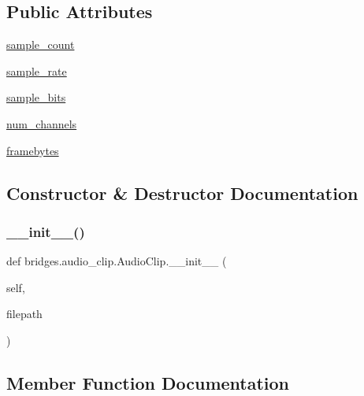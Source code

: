 \subsection*{Public Attributes}
\begin{DoxyCompactItemize}
\item 
\hyperlink{classbridges_1_1audio__clip_1_1_audio_clip_ac9551b041b0d6b7e7b2a1db623c56159}{sample\+\_\+count}
\item 
\hyperlink{classbridges_1_1audio__clip_1_1_audio_clip_a265e017578bdd94664f308f51b596c6d}{sample\+\_\+rate}
\item 
\hyperlink{classbridges_1_1audio__clip_1_1_audio_clip_a274e7ae8cd17a96d068265795b9c0718}{sample\+\_\+bits}
\item 
\hyperlink{classbridges_1_1audio__clip_1_1_audio_clip_ace413dc6646f965e2d0f75e1d84000c9}{num\+\_\+channels}
\item 
\hyperlink{classbridges_1_1audio__clip_1_1_audio_clip_a8af93e6689978881cc60e7cdf4092ce7}{framebytes}
\end{DoxyCompactItemize}


\subsection{Constructor \& Destructor Documentation}
\mbox{\label{classbridges_1_1audio__clip_1_1_audio_clip_aa159be044564628f5c87dc1e988e2b4e}} 
\subsubsection{\texorpdfstring{\+\_\+\+\_\+init\+\_\+\+\_\+()}{\_\_init\_\_()}}
{\footnotesize\ttfamily def bridges.\+audio\+\_\+clip.\+Audio\+Clip.\+\_\+\+\_\+init\+\_\+\+\_\+ (\begin{DoxyParamCaption}\item[{}]{self,  }\item[{}]{filepath }\end{DoxyParamCaption})}



\subsection{Member Function Documentation}
\mbox{\label{classbridges_1_1audio__clip_1_1_audio_clip_a3c60325b9493a6db3f4a76362c4c4e54}} 
